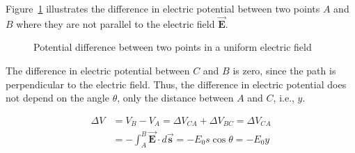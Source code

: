 Figure~\ref{fig:potantial-difference-in-a-uniform-electric-field} illustrates the difference in electric potential between two points $A$ and $B$ where they are not parallel to the electric field $\vec{\boldsymbol{E}}$.
\begin{figure}[H]
\centering
{}
  \caption{Potential difference between two points in a uniform electric field}
  \label{fig:potantial-difference-in-a-uniform-electric-field}
\end{figure}
The difference in electric potential between $C$ and $B$ is zero, since the path is perpendicular to the electric field. Thus, the difference in electric potential does not depend on the angle $\theta$, only the distance between $A$ and $C$, i.e., $y$.

\begin{align*}
  \Delta V &= V_B - V_A = \Delta V_{CA} + \Delta V_{BC} = \Delta V_{CA} \\
  &= -\int_A^B \vec{\boldsymbol{E}} \cdot d\vec{\boldsymbol{s}} = -E_0s\cos{\theta} = -E_0y
\end{align*}



